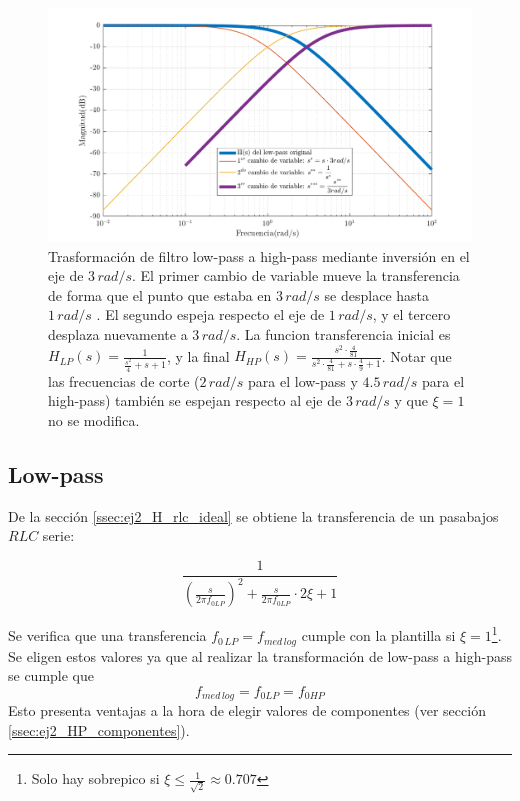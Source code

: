 \begin{figure}	%
	\includegraphics[width = \textwidth]{imagenes/LP2HP_example.png}
	\caption[Trasformaci\'on de filtro low-pass a high-pass]{Trasformaci\'on de filtro low-pass a high-pass mediante inversi\'on en el eje de $3\, rad/s$. El primer cambio de variable mueve la transferencia de forma que el punto que estaba en $3\, rad/s$ se desplace hasta $1\, rad/s$ . El segundo espeja respecto el eje de $1\, rad/s$, y el tercero desplaza nuevamente a $3\, rad/s$. La funcion transferencia inicial es $H_{LP}(s) = \frac{1}{\frac{s^2}{4}+s+1}$, y la final $H_{HP}(s) = \frac{s^2\cdot \frac{4}{81}}{s^2\cdot \frac{4}{81}+s\cdot \frac{4}{9}+1}$. Notar que las frecuencias de corte ($2\, rad/s$ para el low-pass y $4.5\, rad/s$ para el high-pass) tambi\'en se espejan respecto al eje de $3\, rad/s$ y que $\xi=1$ no se modifica.}
	\label{fig:ej2_LP2HP_example}
\end{figure}


 



\subsection{Low-pass}

De la secci\'on \ref{ssec:ej2_H_rlc_ideal} se obtiene la transferencia de un pasabajos $RLC$ serie:

	\begin{equation}
	\frac{1}{\left(\frac{s}{2\pi f_{0LP}}\right)^2 + \frac{s}{2\pi f_{0LP}} \cdot 2\xi + 1}
	\label{eq:ej2_LP_tf_syms}
	\end{equation}	
	

Se verifica que una transferencia $f_{0\,LP}=f_{med\, log}$ cumple con la plantilla si $\xi = 1$\footnote{Solo hay sobrepico si $\xi\leqslant \frac{1}{\sqrt{2}}\approx 0.707$}. Se eligen estos valores ya que al realizar la transformaci\'on de low-pass a high-pass se cumple que 
\begin{equation}
	f_{med\, log} = f_{0LP} = f_{0HP}
	\label{eq:ej2_f0_LP_HP}
\end{equation} 
Esto presenta ventajas a la hora de elegir valores de componentes (ver secci\'on \ref{ssec:ej2_HP_componentes}).


